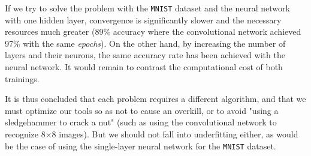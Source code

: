 \documentclass[11pt,a4paper]{article}
\begin{document}
If we try to solve the problem with the \texttt{MNIST} dataset and the neural network with one hidden layer, convergence is significantly slower and the necessary resources much greater (89\% accuracy where the convolutional network achieved 97\% with the same \textit{epochs}). On the other hand, by increasing the number of layers and their neurons, the same accuracy rate has been achieved with the neural network. It would remain to contrast the computational cost of both trainings.  

It is thus concluded that each problem requires a different algorithm, and that we must optimize our tools so as not to cause an overkill, or to avoid "using a sledgehammer to crack a nut" (such as using the convolutional network to recognize 8$\times$8 images). But we should not fall into underfitting either, as would be the case of using the single-layer neural network for the \texttt{MNIST} dataset.
\end{document}

